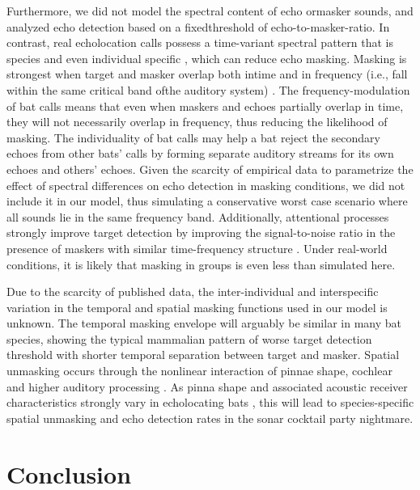 \documentclass[
]{book}
\begin{document}
Furthermore, we did not model the spectral content of echo ormasker sounds, and analyzed echo detection based on a fixedthreshold of echo-to-masker-ratio. In contrast, real echolocation calls possess a time-variant spectral pattern that is species and even individual specific \citep{gillam2010a, yovel-a}, which can reduce echo masking. Masking is strongest when target and masker overlap both intime and in frequency (i.e., fall within the same critical band ofthe auditory system) \citep{ebata2003a, fletcher1940a}. The frequency-modulation of bat calls means that even when maskers and echoes partially overlap in time, they will not necessarily overlap in frequency, thus reducing the likelihood of masking. The individuality of bat calls may help a bat reject the secondary echoes from other bats' calls by forming separate auditory streams \citep{fay2008a} for its own echoes and others' echoes. Given the scarcity of empirical data to parametrize the effect of spectral differences on echo detection in masking conditions, we did not include it in our model, thus simulating a conservative worst case scenario where all sounds lie in the same frequency band. Additionally, attentional processes strongly improve target detection by improving the signal-to-noise ratio in the presence of maskers with similar time-frequency structure \citep{hafter2008a}. Under real-world conditions, it is likely that masking in groups is even less than simulated here.

Due to the scarcity of published data, the inter-individual and interspecific variation in the temporal and spatial masking functions used in our model is unknown. The temporal masking envelope will arguably be similar in many bat species, showing the typical mammalian pattern of worse target detection threshold with shorter temporal separation between target and masker. Spatial unmasking occurs through the nonlinear interaction of pinnae shape, cochlear and higher auditory processing \citep{ebata2003a, Culling2017}. As pinna shape and associated acoustic receiver characteristics strongly vary in echolocating bats \citep{obrist1993a}, this will lead to species-specific spatial unmasking and echo detection rates in the sonar cocktail party nightmare.

\hypertarget{conclusion}{%
\section{Conclusion}\label{conclusion}}
\end{document}
